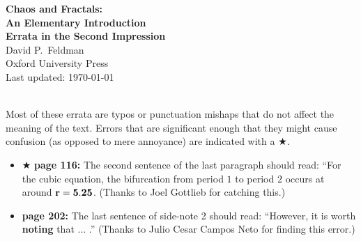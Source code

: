 \documentclass[12pt]{article}
\begin{document}
\pagestyle{empty}

\begin{center}

{\Large {\bf Chaos and Fractals:}}\\
\medskip
{\bf {\large An Elementary Introduction}}\\
\bigskip
{\bf {\LARGE Errata in the Second Impression}}\\
\bigskip
{ {\large David P.~Feldman}}\\
\medskip
Oxford University Press\\
\smallskip
Last updated: \today
\end{center}
\hspace{2mm}\\

\noindent Most of these errata are typos or punctuation mishaps that
do not affect the meaning of the text.  Errors that are significant
enough that they might cause confusion (as opposed to mere annoyance)
are indicated with a $\bigstar$.\\ 


\begin{itemize}

   \item $\bigstar$ {\bf page 116:}  The second sentence of the last
    paragraph should read: ``For the cubic equation, the bifurcation
    from period $1$ to period $2$ occurs at around ${\bf r=5.25}$.
(Thanks to Joel Gottlieb for catching this.)



  \item {\bf page 202:}  The last sentence of side-note 2 should read:
    ``However, it is worth {\bf noting} that ... .''  (Thanks to Julio
    Cesar Campos Neto for finding this error.)


\end{itemize}
\bigskip
\end{document}
